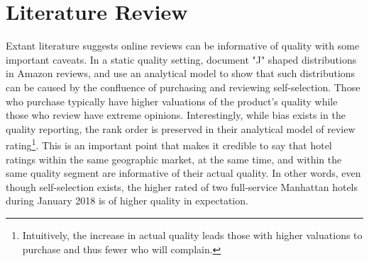 \documentclass[12pt, leqno]{article}
\begin{document}
\section*{Literature Review} \label{sec:literature}

Extant literature suggests online reviews can be informative of quality with some important caveats. In a static quality setting, \citet{hu2006can} document "J" shaped distributions in Amazon reviews, and use an analytical model to show that such distributions can be caused by the confluence of purchasing and reviewing self-selection. Those who purchase typically have higher valuations of the product's quality while those who review have extreme opinions. Interestingly, while bias exists in the quality reporting, the rank order is preserved in their analytical model of review rating\footnote{%
Intuitively, the increase in actual quality leads those with higher valuations to purchase and thus fewer who will complain.}. This is an important point that makes it credible to say that hotel ratings within the same geographic market, at the same time, and within the same quality segment are informative of their actual quality. In other words, even though self-selection exists, the higher rated of two full-service Manhattan hotels during January 2018 is of higher quality in expectation.
\end{document}
